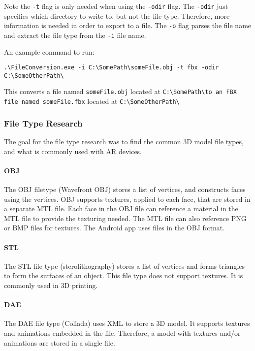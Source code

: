     Note the \texttt{-t} flag is only needed when using the \texttt{-odir} flag.  The \texttt{-odir} just specifies which directory to write to, but not the file type.
    Therefore, more information is needed in order to export to a file.  The \texttt{-o} flag parses the file name and extract the file type from the \texttt{-i} file name.
    
    An example command to run:
    
    \begin{center}
        \texttt{.\textbackslash FileConversion.exe -i C:\textbackslash SomePath\textbackslash someFile.obj -t fbx -odir C:\textbackslash SomeOtherPath\textbackslash}
    \end{center}
    
    This converts a file named \texttt{someFile.obj} located at \texttt{C:\textbackslash SomePath\textbackslash  to an FBX file named someFile.fbx} located at 
    \texttt{C:\textbackslash SomeOtherPath\textbackslash}
    
    \subsubsection{File Type Research}

    The goal for the file type research was to find the common 3D model file types, and what is commonly used with AR devices.

    \paragraph{OBJ}
    The OBJ filetype (Wavefront OBJ) stores a list of vertices, and constructs faces using the vertices.  OBJ supports textures, applied to each face, that are stored in a separate MTL file.  Each face in the OBJ file can reference a material in the MTL file to provide the texturing needed. The MTL file can also reference PNG or BMP files for textures. The Android app uses files in the OBJ format.

    \paragraph{STL}
    The STL file type (sterolithography) stores a list of vertices and forms triangles to form the surfaces of an object.  This file type does not support textures.  It is commonly used in 3D printing.

    \paragraph{DAE}
    The DAE file type (Collada) uses XML to store a 3D model.  It supports textures and animations embedded in the file.  Therefore, a model with textures and/or animations are stored in a single file.

